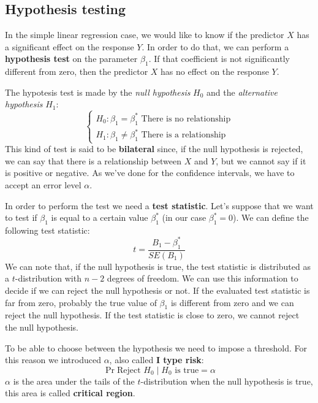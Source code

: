 \subsection{Hypothesis testing}
In the simple linear regression case, we would like to know if the predictor $X$ has a significant effect on the response $Y$. In order to do that, we can perform a \textbf{hypothesis test} on the parameter $\beta_1$.
If that coefficient is not significantly different from zero, then the predictor $X$ has no effect on the response $Y$.

The hypotesis test is made by the \textit{null hypothesis} $H_0$ and the \textit{alternative hypothesis} $H_1$:
\[\begin{cases}
    H_0: \beta_1 = \beta^\ast_1 \text{ There is no relationship}\\
    H_1: \beta_1 \neq \beta^\ast_1 \text{ There is a relationship}
\end{cases}\]
This kind of test is said to be \textbf{bilateral} since, if the null hypothesis is rejected, we can say that there is a relationship between $X$ and $Y$, but we cannot say if it is positive or negative.
As we've done for the confidence intervals, we have to accept an error level $\alpha$.

In order to perform the test we need a \textbf{test statistic}.
Let's suppose that we want to test if $\beta_1$ is equal to a certain value $\beta_1^\ast$ (in our case $\beta_1^\ast = 0$). We can define the following test statistic:
\[
    t = \frac{B_1 - \beta_1^\ast}{SE(B_1)}
\]
We can note that, if the null hypothesis is true, the test statistic is distributed as a $t$-distribution with $n-2$ degrees of freedom. 
We can use this information to decide if we can reject the null hypothesis or not. If the evaluated test statistic is far from zero, probably the true value of $\beta_1$ is different from zero and we can reject the null hypothesis. If the test statistic is close to zero, we cannot reject the null hypothesis.

To be able to choose between the hypothesis we need to impose a threshold. For this reason we introduced $\alpha$, also called \textbf{I type risk}:
\[
    \Pr{\text{Reject } H_0 \mid H_0 \text{ is true}} = \alpha
\]
$\alpha$ is the area under the tails of the $t$-distribution when the null hypothesis is true, this area is called \textbf{critical region}.

